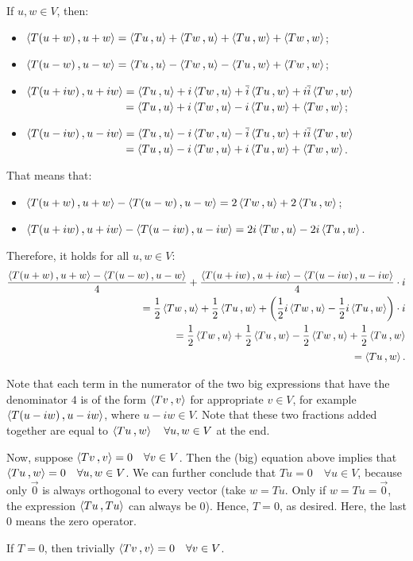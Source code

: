 \begin{prf}
  \Rightarrowdirection If $u,w \in V$, then:
  \begin{itemize}
    \item $\ip{T(u+w)}{u+w} = \ip{Tu}{u} + \ip{Tw}{u} + \ip{Tu}{w} + \ip{Tw}{w}$;
    \item $\ip{T(u-w)}{u-w} = \ip{Tu}{u} - \ip{Tw}{u} - \ip{Tu}{w} + \ip{Tw}{w}$;
    \item $\ip{T(u+iw)}{u+iw} = \ip{Tu}{u} + i\ip{Tw}{u} + \overline i \ip{Tu}{w} + i \overline i \ip{Tw}{w}$ \\
    $\hphantom{\ip{T(u+iw)}{u+iw} } = \ip{Tu}{u} + i \ip{Tw}{u} - i\ip{Tu}{w} + \ip{Tw}{w}$;
    \item $\ip{T(u-iw)}{u-iw} = \ip{Tu}{u} - i\ip{Tw}{u} - \overline i \ip{Tu}{w} + i \overline i \ip{Tw}{w}$ \\
    $\hphantom{\ip{T(u-iw)}{u-iw} } = \ip{Tu}{u} - i \ip{Tw}{u} + i\ip{Tu}{w} + \ip{Tw}{w}$.
  \end{itemize}

  That means that:
  \begin{itemize}
    \item $\ip{T(u+w)}{u+w} - \ip{T(u-w)}{u-w} = 2 \ip{Tw}{u} + 2 \ip{Tu}{w}$;
    \item $\ip{T(u+iw)}{u+iw} - \ip{T(u-iw)}{u-iw} = 2i \ip{Tw}{u} - 2i\ip{Tu}{w}$.
  \end{itemize}

  Therefore, it holds for all $u,w \in V$:
  \setlength{\abovedisplayskip}{0.6em}
  \[
  \begin{aligned}
      \frac{\ip{T(u+w)}{u+w} - \ip{T(u-w)}{u-w}}{4}
    +
    \frac{\ip{T(u+iw)}{u+iw} - \ip{T(u-iw)}{u-iw}}{4} \cdot i \\
    = \frac{1}{2} \ip{Tw}{u} + \frac{1}{2} \ip{Tu}{w} + \left(\frac{1}{2}i \ip{Tw}{u} - \frac{1}{2}i\ip{Tu}{w} \right)\cdot i \\
    = \frac{1}{2} \ip{Tw}{u} + \frac{1}{2} \ip{Tu}{w} - \frac{1}{2} \ip{Tw}{u} + \frac{1}{2}\ip{Tu}{w} \\
    = \ip{Tu}{w}.
  \end{aligned}
  \]
  \setlength{\abovedisplayskip}{0.1em} %

  Note that each term in the numerator of the two big expressions that have the denominator $4$ is of the form $\ip{Tv}{v}$ for appropriate $v \in V$, for example $\ip{T(u-iw)}{u-iw}$, where $u-iw \in V$. Note that these two fractions added together are equal to $\ip{Tu}{w} \quad \forall u,w \in V$ at the end.

  Now, suppose $\ip{Tv}{v} = 0 \quad \forall v \in V$. Then the (big) equation above implies that $\ip{Tu}{w} = 0 \quad \forall u, w \in V$.
  We can further conclude that $Tu=0 \quad \forall u \in V$, because only $\vec 0$ is always orthogonal to every vector (take $w=Tu$. Only if $w=Tu=\vec 0$, the expression $\ip{Tu}{Tu}$ can always be $0$). Hence, $T=0$, as desired. Here, the last $0$ means the zero operator.

  \Leftarrowdirection If $T = 0$, then trivially $\ip{Tv}{v}=0 \quad \forall v \in V$.
\end{prf}

